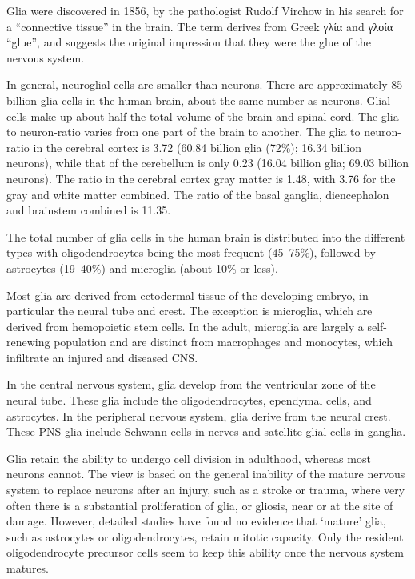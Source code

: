 Glia were discovered in 1856, by the pathologist Rudolf Virchow in his search for a ``connective tissue'' in the brain. The term derives from Greek γλία and γλοία ``glue'', and suggests the original impression that they were the glue of the nervous system.

In general, neuroglial cells are smaller than neurons. There are approximately 85 billion glia cells in the human brain, about the same number as neurons. Glial cells make up about half the total volume of the brain and spinal cord. The glia to neuron-ratio varies from one part of the brain to another. The glia to neuron-ratio in the cerebral cortex is 3.72 (60.84 billion glia (72\%); 16.34 billion neurons), while that of the cerebellum is only 0.23 (16.04 billion glia; 69.03 billion neurons). The ratio in the cerebral cortex gray matter is 1.48, with 3.76 for the gray and white matter combined. The ratio of the basal ganglia, diencephalon and brainstem combined is 11.35.

The total number of glia cells in the human brain is distributed into the different types with oligodendrocytes being the most frequent (45--75\%), followed by astrocytes (19--40\%) and microglia (about 10\% or less).

Most glia are derived from ectodermal tissue of the developing embryo, in particular the neural tube and crest. The exception is microglia, which are derived from hemopoietic stem cells. In the adult, microglia are largely a self-renewing population and are distinct from macrophages and monocytes, which infiltrate an injured and diseased CNS.

In the central nervous system, glia develop from the ventricular zone of the neural tube. These glia include the oligodendrocytes, ependymal cells, and astrocytes. In the peripheral nervous system, glia derive from the neural crest. These PNS glia include Schwann cells in nerves and satellite glial cells in ganglia.

Glia retain the ability to undergo cell division in adulthood, whereas most neurons cannot. The view is based on the general inability of the mature nervous system to replace neurons after an injury, such as a stroke or trauma, where very often there is a substantial proliferation of glia, or gliosis, near or at the site of damage. However, detailed studies have found no evidence that `mature' glia, such as astrocytes or oligodendrocytes, retain mitotic capacity. Only the resident oligodendrocyte precursor cells seem to keep this ability once the nervous system matures.

